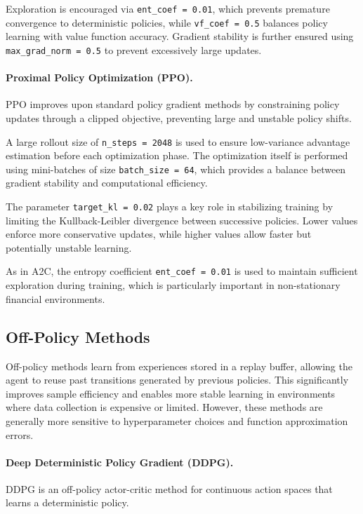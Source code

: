 Exploration is encouraged via \texttt{ent\_coef = 0.01}, which prevents premature convergence
to deterministic policies, while \texttt{vf\_coef = 0.5} balances policy learning with value
function accuracy. Gradient stability is further ensured using \texttt{max\_grad\_norm = 0.5}
to prevent excessively large updates.

\paragraph{Proximal Policy Optimization (PPO).} 
PPO improves upon standard policy gradient methods by constraining policy updates through a 
clipped objective, preventing large and unstable policy shifts.

A large rollout size of \texttt{n\_steps = 2048} is used to ensure low-variance advantage
estimation before each optimization phase. The optimization itself is performed using
mini-batches of size \texttt{batch\_size = 64}, which provides a balance between gradient
stability and computational efficiency.

The parameter \texttt{target\_kl = 0.02} plays a key role in stabilizing training by limiting
the Kullback-Leibler divergence between successive policies. Lower values enforce more conservative
updates, while higher values allow faster but potentially unstable learning.

As in A2C, the entropy coefficient \texttt{ent\_coef = 0.01} is used to maintain sufficient
exploration during training, which is particularly important in non-stationary financial
environments.

\subsection{Off-Policy Methods}

Off-policy methods learn from experiences stored in a replay buffer, allowing the agent 
to reuse past transitions generated by previous policies. This significantly improves 
sample efficiency and enables more stable learning in environments where data collection 
is expensive or limited. However, these methods are generally more sensitive to hyperparameter
choices and function approximation errors.

\paragraph{Deep Deterministic Policy Gradient (DDPG).} 
DDPG is an off-policy actor-critic method for continuous action spaces that learns a 
deterministic policy.

